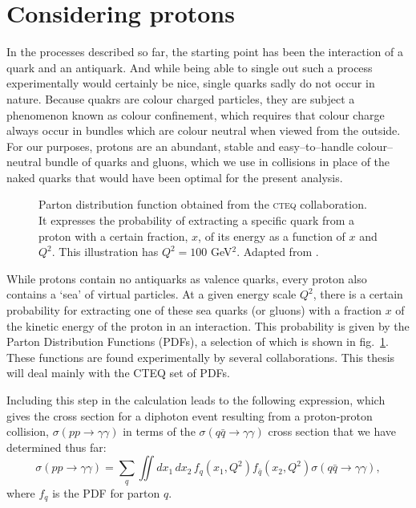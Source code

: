 \section{Considering protons \label{sec.pdfth}}
In the processes described so far, the starting point has been the interaction of a quark and an antiquark. And while being able to single out such a process experimentally would certainly be nice, single quarks sadly do not occur in nature. Because quakrs are colour charged particles, they are subject a phenomenon known as colour confinement, which requires that colour charge always occur in bundles which are colour neutral when viewed from the outside. For our purposes, protons are an abundant, stable and easy--to--handle colour--neutral bundle of quarks and gluons, which we use in collisions in place of the naked quarks that would have been optimal for the present analysis.

\begin{figure}[htp]
\begin{minipage}[b]{.69\textwidth}
\begin{infilsf} 
\tiny 

\end{infilsf}
\end{minipage}
\hfill\begin{minipage}[b]{.3\textwidth}
\caption{Parton distribution function obtained from the \textsc{cteq} collaboration. It expresses the probability of extracting a specific quark from a proton with a certain fraction, $x$, of its energy as a function of $x$ and $Q^2$. This illustration has $Q^2 = 100$ GeV$^2$. Adapted from \cite{durpdf}.\label{pdff}}
\end{minipage}
\end{figure}

While protons contain no antiquarks as valence quarks, every proton also contains a `sea' of virtual particles. At a given energy scale $Q^2$, there is a certain probability for extracting one of these sea quarks (or gluons) with a fraction $x$ of the kinetic energy of the proton in an interaction. This probability is given by the Parton Distribution Functions (PDFs), a selection of which is shown in fig.~\ref{pdff}. These functions are found experimentally by several collaborations. This thesis will deal mainly with the CTEQ set of PDFs.

Including this step in the calculation leads to the following expression, which gives the cross section for a diphoton event resulting from a proton-proton collision, $\sigma(pp\rightarrow\gamma\gamma)$ in terms of the $\sigma(q\bar q \rightarrow \gamma\gamma)$ cross section that we have determined thus far:
\[\sigma(pp\rightarrow\gamma\gamma)=\sum_q\iint dx_1\,dx_2\,f_q(x_1,Q^2)f_{\bar q}(x_2,Q^2)\sigma(q\bar q\rightarrow\gamma\gamma),\label{pdf}\]
where $f_q$ is the PDF for parton $q$.


